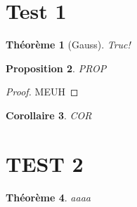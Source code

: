 \documentclass[a4paper, 12pt]{article}
\theoremstyle{break}
\newtheorem{thm}{Théorème}[section]
\newtheorem{prop}[thm]{Proposition}
\newtheorem{cor}[thm]{Corollaire}
\theoremstyle{definition}
\begin{document}
\title{}
\author{}
\date{\today}
\maketitle

\section{Test 1}%
\label{sec:test_1}

\begin{thm}[Gauss]
    Truc!
\end{thm}

\begin{prop}
    PROP
\end{prop}

\begin{proof}
    MEUH
\end{proof}

\begin{cor}
    COR
\end{cor}


\section{TEST 2}%
\begin{thm}
    aaaa
\end{thm}
\label{sec:test_2}
\end{document}
